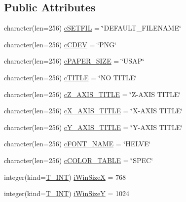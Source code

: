 \subsection*{Public Attributes}
\begin{DoxyCompactItemize}
\item 
character(len=256) \hyperlink{typetest_1_1_t___g_r_a_p_h___c_o_n_f_i_g_u_r_a_t_i_o_n_ae48ca27f38b9e65fc264c43b26cd520c}{cSETFIL} = \char`\"{}DEFAULT\_\-FILENAME\char`\"{}
\item 
character(len=256) \hyperlink{typetest_1_1_t___g_r_a_p_h___c_o_n_f_i_g_u_r_a_t_i_o_n_adde2cf4c5be79e58cb1016aaaba25412}{cCDEV} = \char`\"{}PNG\char`\"{}
\item 
character(len=256) \hyperlink{typetest_1_1_t___g_r_a_p_h___c_o_n_f_i_g_u_r_a_t_i_o_n_adbb5bf5964ed6673dcb8cc3527f06245}{cPAPER\_\-SIZE} = \char`\"{}USAP\char`\"{}
\item 
character(len=256) \hyperlink{typetest_1_1_t___g_r_a_p_h___c_o_n_f_i_g_u_r_a_t_i_o_n_a37e7da7a7e44b1fc2cd4cd249ca1e48f}{cTITLE} = \char`\"{}NO TITLE\char`\"{}
\item 
character(len=256) \hyperlink{typetest_1_1_t___g_r_a_p_h___c_o_n_f_i_g_u_r_a_t_i_o_n_a55c100d93411fe8360475d06be02ad38}{cZ\_\-AXIS\_\-TITLE} = \char`\"{}Z-\/AXIS TITLE\char`\"{}
\item 
character(len=256) \hyperlink{typetest_1_1_t___g_r_a_p_h___c_o_n_f_i_g_u_r_a_t_i_o_n_afec33275cb847b0436e770201576f7ca}{cX\_\-AXIS\_\-TITLE} = \char`\"{}X-\/AXIS TITLE\char`\"{}
\item 
character(len=256) \hyperlink{typetest_1_1_t___g_r_a_p_h___c_o_n_f_i_g_u_r_a_t_i_o_n_a8619095ac040b17a896ae919c1b195e5}{cY\_\-AXIS\_\-TITLE} = \char`\"{}Y-\/AXIS TITLE\char`\"{}
\item 
character(len=256) \hyperlink{typetest_1_1_t___g_r_a_p_h___c_o_n_f_i_g_u_r_a_t_i_o_n_a46682f51ea3e65d3bf8c54ab2fecf2f7}{cFONT\_\-NAME} = \char`\"{}HELVE\char`\"{}
\item 
character(len=256) \hyperlink{typetest_1_1_t___g_r_a_p_h___c_o_n_f_i_g_u_r_a_t_i_o_n_a65ebf1581c5437e0b6ff2245d50d94b1}{cCOLOR\_\-TABLE} = \char`\"{}SPEC\char`\"{}
\item 
integer(kind=\hyperlink{namespacetest_a6f91ebd89b58cfcc5da99faed9385c1e}{T\_\-INT}) \hyperlink{typetest_1_1_t___g_r_a_p_h___c_o_n_f_i_g_u_r_a_t_i_o_n_ad37a59914769728f77636dd0ef09e858}{iWinSizeX} = 768
\item 
integer(kind=\hyperlink{namespacetest_a6f91ebd89b58cfcc5da99faed9385c1e}{T\_\-INT}) \hyperlink{typetest_1_1_t___g_r_a_p_h___c_o_n_f_i_g_u_r_a_t_i_o_n_abd48864ef06ee6daa0e7d98623d3907f}{iWinSizeY} = 1024

\end{DoxyCompactItemize}
